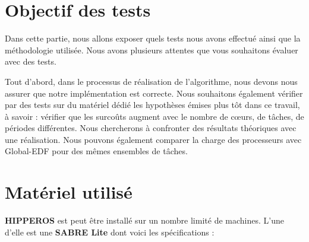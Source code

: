 \section{Objectif des tests}

	Dans cette partie, nous allons exposer quels tests nous avons effectué ainsi que 
	la méthodologie utilisée.
	Nous avons plusieurs attentes que vous souhaitons évaluer avec des tests. \newline
	 
	Tout d'abord, dans le processus de réalisation de l'algorithme, nous devons nous assurer 
	que notre implémentation est correcte. Nous souhaitons également vérifier par des tests 
	sur du matériel dédié les hypothèses émises  plus tôt dans ce travail, 
	à savoir : vérifier que les surcoûts augment avec le nombre de cœurs, de tâches, 
	de périodes différentes. 
	Nous chercherons à confronter des résultats théoriques avec une réalisation.
	Nous pouvons également comparer la charge des processeurs avec Global-EDF pour des mêmes ensembles de tâches.

	

\section{Matériel utilisé}
	\textbf{HIPPEROS} est peut être installé sur un nombre limité de machines. 
	L'une d'elle est une \textbf{SABRE Lite} dont voici les spécifications :
	

